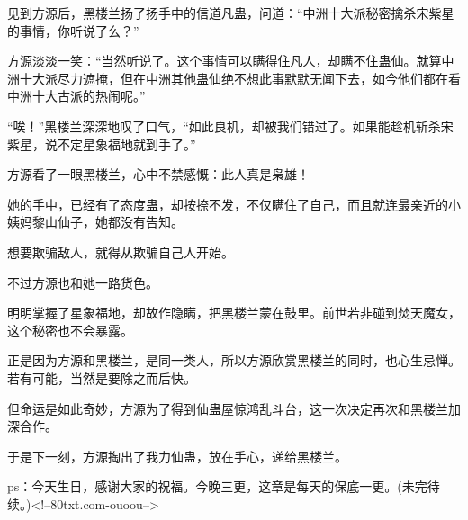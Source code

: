 \begin{this_body}
见到方源后，黑楼兰扬了扬手中的信道凡蛊，问道：“中洲十大派秘密擒杀宋紫星的事情，你听说了么？”

方源淡淡一笑：“当然听说了。这个事情可以瞒得住凡人，却瞒不住蛊仙。就算中洲十大派尽力遮掩，但在中洲其他蛊仙绝不想此事默默无闻下去，如今他们都在看中洲十大古派的热闹呢。”

“唉！”黑楼兰深深地叹了口气，“如此良机，却被我们错过了。如果能趁机斩杀宋紫星，说不定星象福地就到手了。”

方源看了一眼黑楼兰，心中不禁感慨：此人真是枭雄！

她的手中，已经有了态度蛊，却按捺不发，不仅瞒住了自己，而且就连最亲近的小姨妈黎山仙子，她都没有告知。

想要欺骗敌人，就得从欺骗自己人开始。

不过方源也和她一路货色。

明明掌握了星象福地，却故作隐瞒，把黑楼兰蒙在鼓里。前世若非碰到焚天魔女，这个秘密也不会暴露。

正是因为方源和黑楼兰，是同一类人，所以方源欣赏黑楼兰的同时，也心生忌惮。若有可能，当然是要除之而后快。

但命运是如此奇妙，方源为了得到仙蛊屋惊鸿乱斗台，这一次决定再次和黑楼兰加深合作。

于是下一刻，方源掏出了我力仙蛊，放在手心，递给黑楼兰。

ps：今天生日，感谢大家的祝福。今晚三更，这章是每天的保底一更。(未完待续。)<!--80txt.com-ouoou-->

\end{this_body}

